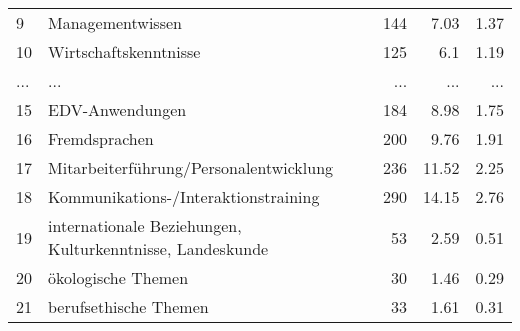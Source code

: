 \begin{longtable}{lXrrr}
        9 & \multicolumn{1}{X}{Managementwissen} & %
          \num{144} &
          \num[round-mode=places,round-precision=2]{7,03} &
          \num[round-mode=places,round-precision=2]{1,37} \\
        10 & \multicolumn{1}{X}{Wirtschaftskenntnisse} & %
          \num{125} &
          \num[round-mode=places,round-precision=2]{6,1} &
          \num[round-mode=places,round-precision=2]{1,19} \\
       ... & ... & ... & ... & ... \\
        15 & \multicolumn{1}{X}{EDV-Anwendungen} & %
          \num{184} &
          \num[round-mode=places,round-precision=2]{8,98} &
          \num[round-mode=places,round-precision=2]{1,75} \\

        16 & \multicolumn{1}{X}{Fremdsprachen} & %
          \num{200} &
          \num[round-mode=places,round-precision=2]{9,76} &
          \num[round-mode=places,round-precision=2]{1,91} \\

        17 & \multicolumn{1}{X}{Mitarbeiterführung/Personalentwicklung} & %
          \num{236} &
          \num[round-mode=places,round-precision=2]{11,52} &
          \num[round-mode=places,round-precision=2]{2,25} \\

        18 & \multicolumn{1}{X}{Kommunikations-/Interaktionstraining} & %
          \num{290} &
          \num[round-mode=places,round-precision=2]{14,15} &
          \num[round-mode=places,round-precision=2]{2,76} \\

        19 & \multicolumn{1}{X}{internationale Beziehungen, Kulturkenntnisse, Landeskunde} & %
          \num{53} &
          \num[round-mode=places,round-precision=2]{2,59} &
          \num[round-mode=places,round-precision=2]{0,51} \\

        20 & \multicolumn{1}{X}{ökologische Themen} & %
          \num{30} &
          \num[round-mode=places,round-precision=2]{1,46} &
          \num[round-mode=places,round-precision=2]{0,29} \\

        21 & \multicolumn{1}{X}{berufsethische Themen} & %
          \num{33} &
          \num[round-mode=places,round-precision=2]{1,61} &
          \num[round-mode=places,round-precision=2]{0,31} \\


\end{longtable}
